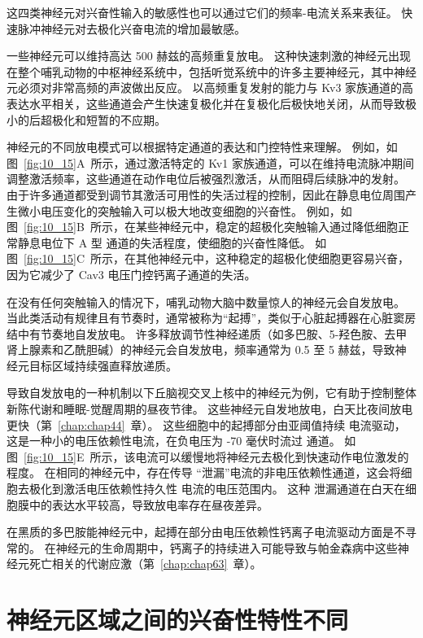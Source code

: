 这四类神经元对兴奋性输入的敏感性也可以通过它们的频率-电流关系来表征。
快速脉冲神经元对去极化兴奋电流的增加最敏感。


一些神经元可以维持高达 500 赫兹的高频重复放电。
这种快速刺激的神经元出现在整个哺乳动物的中枢神经系统中，包括听觉系统中的许多主要神经元，其中神经元必须对非常高频的声波做出反应。
以高频重复发射的能力与 Kv3 家族通道的高表达水平相关，这些通道会产生快速复极化并在复极化后极快地关闭，从而导致极小的后超极化和短暂的不应期。


神经元的不同放电模式可以根据特定通道的表达和门控特性来理解。
例如，如图~\ref{fig:10_15}A~所示，通过激活特定的 Kv1 家族通道，可以在维持电流脉冲期间调整激活频率，这些通道在动作电位后被强烈激活，从而阻碍后续脉冲的发射。
由于许多通道都受到调节其激活可用性的失活过程的控制，因此在静息电位周围产生微小电压变化的突触输入可以极大地改变细胞的兴奋性。
例如，如图~\ref{fig:10_15}B~所示，在某些神经元中，稳定的超极化突触输入通过降低细胞正常静息电位下 A 型  通道的失活程度，使细胞的兴奋性降低。
如图~\ref{fig:10_15}C~所示，在其他神经元中，这种稳定的超极化使细胞更容易兴奋，因为它减少了 Cav3 电压门控钙离子通道的失活。


在没有任何突触输入的情况下，哺乳动物大脑中数量惊人的神经元会自发放电。
当此类活动有规律且有节奏时，通常被称为“起搏”，类似于心脏起搏器在心脏窦房结中有节奏地自发放电。
许多释放调节性神经递质（如多巴胺、5-羟色胺、去甲肾上腺素和乙酰胆碱）的神经元会自发放电，频率通常为 0.5 至 5 赫兹，导致神经元目标区域持续强直释放递质。


导致自发放电的一种机制以下丘脑视交叉上核中的神经元为例，它有助于控制整体新陈代谢和睡眠-觉醒周期的昼夜节律。
这些神经元自发地放电，白天比夜间放电更快（第~\ref{chap:chap44}~章）。 
这些细胞中的起搏部分由亚阈值持续  电流驱动，这是一种小的电压依赖性电流，在负电压为 -70 毫伏时流过  通道。
如图~\ref{fig:10_15}E~所示，该电流可以缓慢地将神经元去极化到快速动作电位激发的程度。
在相同的神经元中，存在传导 “泄漏”电流的非电压依赖性通道，这会将细胞去极化到激活电压依赖性持久性  电流的电压范围内。
这种  泄漏通道在白天在细胞膜中的表达水平较高，导致放电率存在昼夜差异。


在黑质的多巴胺能神经元中，起搏在部分由电压依赖性钙离子电流驱动方面是不寻常的。
在神经元的生命周期中，钙离子的持续进入可能导致与帕金森病中这些神经元死亡相关的代谢应激（第~\ref{chap:chap63}~章）。



\section{神经元区域之间的兴奋性特性不同}

